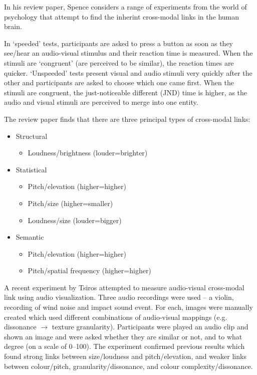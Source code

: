 In his review paper, Spence \cite{Spence2011} considers a range of experiments
from the world of psychology that attempt to find the inherint cross-modal
links in the human brain.

In `speeded' tests, participants are asked to press a button as soon as they
see/hear an audio-visual stimulus and their reaction time is measured. When the
stimuli are `congruent' (are perceived to be similar), the reaction times are
quicker.  `Unspeeded' tests present visual and audio stimuli very quickly after
the other and participants are asked to choose which one came first. When the
stimuli are congruent, the just-noticeable different (JND) time is higher, as
the audio and visual stimuli are perceived to merge into one entity.

The review paper finds that there are three principal types of cross-modal
links:
{\singlespacing
\begin{itemize}
  \item Structural
  \begin{itemize}
    \item Loudness/brightness (louder=brighter)
  \end{itemize}
  \item Statistical
  \begin{itemize}
    \item Pitch/elevation (higher=higher)
    \item Pitch/size (higher=smaller)
    \item Loudness/size (louder=bigger)
  \end{itemize}
  \item Semantic
  \begin{itemize}
    \item Pitch/elevation (higher=higher)
    \item Pitch/spatial frequency (higher=higher)
  \end{itemize}
\end{itemize}
}

A recent experiment by Tsiros \cite{Tsiros2014} attempted to measure
audio-visual cross-modal link using audio visualization. Three audio recordings
were used -- a violin, recording of wind noise and impact sound event. For
each, images were manually created which used different combinations of
audio-visual mappings (e.g. dissonance $\to$ texture granularity). Participants
were played an audio clip and shown an image and were asked whether they are
similar or not, and to what degree (on a scale of 0--100).  The experiment
confirmed previous results which found strong links between size/loudness and
pitch/elevation, and weaker links between colour/pitch, granularity/dissonance,
and colour complexity/dissonance.


